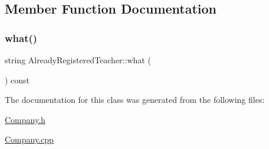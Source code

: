 \subsection{Member Function Documentation}
\mbox{\label{class_already_registered_teacher_a3d7912fc2aa048ad661db2fa82f17d35}} 
\subsubsection{\texorpdfstring{what()}{what()}}
{\footnotesize\ttfamily string Already\+Registered\+Teacher\+::what (\begin{DoxyParamCaption}{ }\end{DoxyParamCaption}) const}



The documentation for this class was generated from the following files\+:\begin{DoxyCompactItemize}
\item 
\mbox{\hyperlink{_company_8h}{Company.\+h}}\item 
\mbox{\hyperlink{_company_8cpp}{Company.\+cpp}}\end{DoxyCompactItemize}
